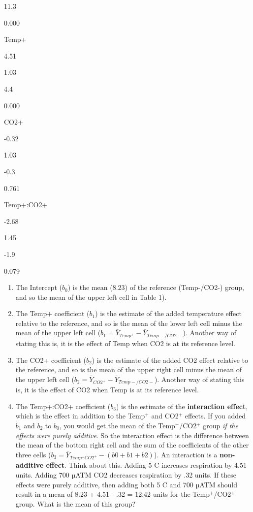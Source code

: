 \documentclass[]{book}
\providecommand{\tightlist}{%
  \setlength{\itemsep}{0pt}\setlength{\parskip}{0pt}}
\begin{document}
11.3

0.000

Temp+

4.51

1.03

4.4

0.000

CO2+

-0.32

1.03

-0.3

0.761

Temp+:CO2+

-2.68

1.45

-1.9

0.079

\begin{enumerate}
\def\labelenumi{\arabic{enumi}.}
\tightlist
\item
  The Intercept (\(b_0\)) is the mean (8.23) of the reference (Temp-/CO2-) group, and so the mean of the upper left cell in Table 1).
\item
  The Temp+ coefficient (\(b_1\)) is the estimate of the added temperature effect relative to the reference, and so is the mean of the lower left cell minus the mean of the upper left cell (\(b_1=\bar{Y}_{Temp^+}-\bar{Y}_{Temp-/CO2-}\)). Another way of stating this is, it is the effect of Temp when CO2 is at its reference level.
\item
  The CO2+ coefficient (\(b_2\)) is the estimate of the added CO2 effect relative to the reference, and so is the mean of the upper right cell minus the mean of the upper left cell (\(b_2=\bar{Y}_{CO2^+}-\bar{Y}_{Temp-/CO2-}\)). Another way of stating this is, it is the effect of CO2 when Temp is at its reference level.
\item
  The Temp+:CO2+ coefficient (\(b_3\)) is the estimate of the \textbf{interaction effect}, which is the effect in addition to the Temp\(^+\) and CO2\(^+\) effects. If you added \(b_1\) and \(b_2\) to \(b_0\), you would get the mean of the Temp\(^+\)/CO2\(^+\) group \emph{if the effects were purely additive}. So the interaction effect is the difference between the mean of the bottom right cell and the sum of the coefficients of the other three cells (\(b_3 = \bar{Y}_{Temp^+CO2^+} - (b0 + b1 + b2)\)). An interaction is a \textbf{non-additive effect}. Think about this. Adding 5 C increases respiration by 4.51 units. Adding 700 µATM CO2 decreases respiration by .32 units. If these effects were purely additive, then adding both 5 C and 700 µATM should result in a mean of 8.23 + 4.51 - .32 = 12.42 units for the Temp\(^+\)/CO2\(^+\) group. What is the mean of this group?
\end{enumerate}
\end{document}
